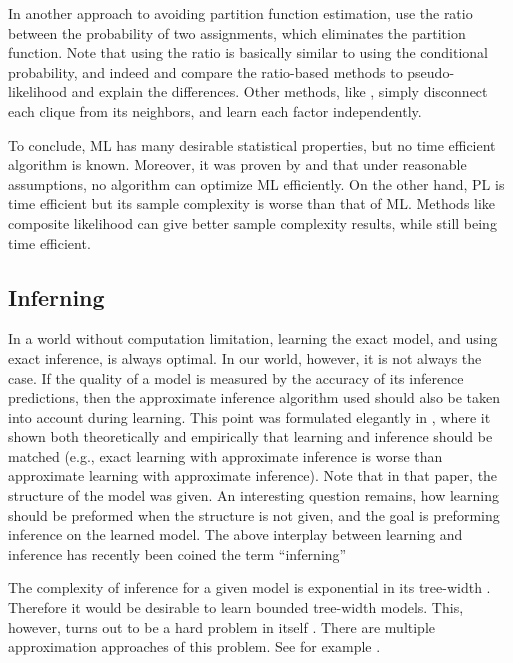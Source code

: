 In another approach to avoiding partition function estimation, \cite{hyvarinen2007some} use the ratio between the probability of two assignments, which eliminates the partition function.
Note that using the ratio is basically similar to using the conditional probability, and indeed \cite{marlin2010inductive} and \cite{marlin2012asymptotic} compare the ratio-based  methods to pseudo-likelihood and explain the differences.
Other methods, like \cite{mizrahi2014icml}, simply disconnect each clique from its neighbors, and learn each factor independently.

To conclude, ML has many desirable statistical properties, but no time efficient algorithm is known. Moreover, it was proven by \cite{bresler2014hardness} and \cite{montanari2015computational} that under reasonable assumptions, no algorithm can optimize ML efficiently. On the other hand, PL is time efficient but its sample complexity is worse than that of ML. Methods like composite likelihood can give better sample complexity results, while still being time efficient.

\subsection{Inferning}
\label{sec:inferning}
In a world without computation limitation, learning the exact model,
and using exact inference, is always optimal. In our world, however, it
is not always the case.  If the quality of a model is measured by the accuracy
of its inference predictions, then the approximate inference algorithm used
should also be taken into account during learning. This point was formulated
elegantly in \cite{wainwright2006estimating}, where it shown both theoretically and empirically that learning and inference should be matched (e.g., exact learning with approximate inference is worse than approximate learning with approximate inference). Note that in that paper, the structure of the model was given.  An interesting question remains, how learning should be preformed when
the structure is not given, and the goal is preforming inference on
the learned model.
The above interplay between learning and inference has recently been coined the term ``inferning'' \cite{rohanimanesh2009training}

The complexity of inference for a given model is exponential in its tree-width \cite{robertson1983graph,robertson1994quickly}.
Therefore it would be desirable to learn bounded tree-width models.
This, however, turns out to be a hard problem in itself \cite{srebro2001maximum}. There are multiple approximation approaches of this problem. See for example \cite{karger2001learning,bach2001thin,elidan2009learning}.
%

